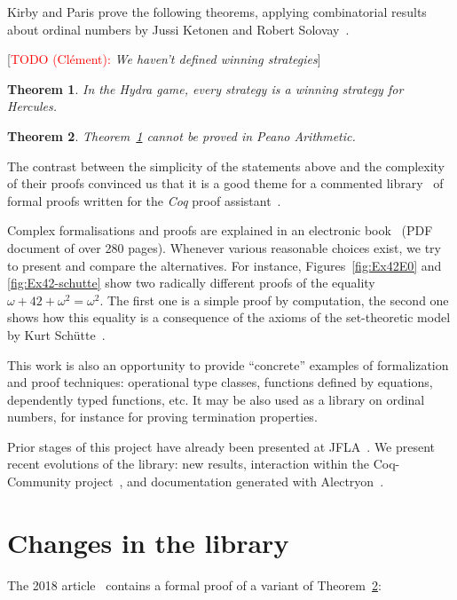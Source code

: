 \documentclass{easychair}
\newtheorem{theorem}{Theorem}
\newcommand{\TODO}[2][]{[\textcolor{red}{TODO (#1):} \emph{#2}]}
\begin{document}

Kirby and Paris prove the following theorems, applying
combinatorial results about ordinal numbers by Jussi Ketonen and Robert Solovay~\cite{KS81}.

\TODO[Clément]{We haven't defined winning strategies}
\begin{theorem}
  In the Hydra game, every strategy is a winning strategy for Hercules. \label{kp:thm1}
\end{theorem}

\begin{theorem}
  Theorem~\ref{kp:thm1} cannot be proved in Peano Arithmetic. \label{kp:thm2}
\end{theorem}

The contrast between the simplicity of the statements above and the complexity of their proofs convinced us that it is a good theme for a commented library~\cite{HydraBattles} of formal proofs written for the \textit{Coq} proof assistant~\cite{Coq}. 

Complex formalisations and proofs are explained in an
  electronic book~\cite{HydraBook} (PDF document of over 280 pages). Whenever various reasonable choices exist, we try to present and compare the alternatives.
  For instance, Figures~\ref{fig:Ex42E0} and \ref{fig:Ex42-schutte} show two radically different proofs of the equality
  $\omega+42+\omega^2=\omega^2$. The first one is a simple proof by computation, the second one shows how this equality
  is a consequence of the axioms of the set-theoretic model  by Kurt Schütte~\cite{schutte}. 

This work is also an opportunity to 
 provide ``concrete'' examples of formalization and proof techniques: operational type classes, functions defined by  equations, dependently typed functions, etc. It may be also used as a library on ordinal numbers, for instance for proving termination properties.

 Prior stages of this project have already been presented at
 JFLA~\cite{PCiota, JFLA2018paper}.
We present recent evolutions of the library: new results, interaction within the Coq-Community project~\cite{CoqCommunity}, and documentation generated with Alectryon~\cite{alectryonpaper, alectryongithub}.

\section{Changes in the library}
The 2018 article~\cite{JFLA2018paper} contains a formal proof of  a variant of Theorem~\ref{kp:thm2}:
\end{document}
